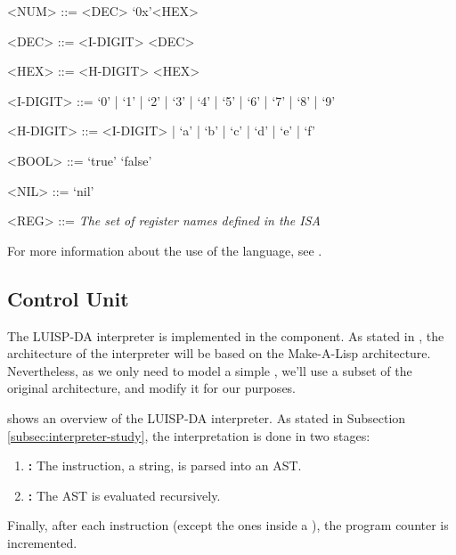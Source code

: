 \begin{tcolorbox}[enhanced jigsaw,breakable,top=4mm]
\begin{grammar}
    <NUM> ::= <DEC>
      \alt `0x'<HEX>

    <DEC> ::= <I-DIGIT>
      <DEC>

    <HEX> ::= <H-DIGIT>
      <HEX>

    <I-DIGIT> ::= `0' | `1' | `2' | `3' | `4' | `5' | `6' | `7' | `8' | `9'

    <H-DIGIT> ::= <I-DIGIT> | `a' | `b' | `c' | `d' | `e' | `f'

    <BOOL> ::= `true'
      \alt `false'

    <NIL> ::= `nil'

    <REG> ::= \textit{The set of \gls{register} names defined in the \gls{ISA}}
  \end{grammar}
\end{tcolorbox}

\noindent
For more information about the use of the language, see .


\subsection{Control Unit}\label{subsec:interpreter-design}
The LUISP-DA \gls{interpreter} is implemented in the  component. As stated in , the architecture of the \gls{interpreter} will be based on the Make-A-Lisp \parencite{mal} architecture. Nevertheless, as we only need to model a simple , we'll use a subset of the original architecture, and modify it for our purposes.

 shows an overview of the LUISP-DA interpreter. As stated in Subsection \ref{subsec:interpreter-study}, the interpretation is done in two stages:
\begin{enumerate}
  \item \textbf{:} The instruction, a string, is parsed into an \gls{AST}.
  \item \textbf{:} The \gls{AST} is evaluated recursively.
\end{enumerate}

Finally, after each instruction (except the ones inside a ), the \gls{program counter} is incremented.


